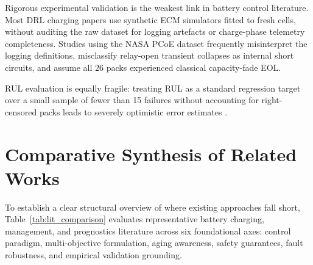 Rigorous experimental validation is the weakest link in battery
control literature.  Most DRL charging papers use synthetic ECM
simulators fitted to fresh cells, without auditing the raw
dataset for logging artefacts or charge-phase telemetry
completeness.  Studies using the NASA PCoE dataset
\cite{saha2008battery, fricke2023nasa} frequently misinterpret
the logging definitions, misclassify relay-open transient collapses
as internal short circuits, and assume all 26 packs experienced
classical capacity-fade EOL.

RUL evaluation is equally fragile: treating RUL as a standard
regression target over a small sample of fewer than 15 failures
without accounting for right-censored packs leads to severely
optimistic error estimates \cite{saxena2015remaining}.

\section{Comparative Synthesis of Related Works}

To establish a clear structural overview of where existing approaches fall
short, Table~\ref{tab:lit_comparison} evaluates representative battery
charging, management, and prognostics literature across six foundational
axes: control paradigm, multi-objective formulation, aging awareness,
safety guarantees, fault robustness, and empirical validation grounding.

